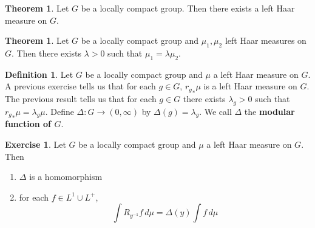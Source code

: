 \documentclass[12pt]{amsart}
\theoremstyle{definition}
\newtheorem{defn}[definition]{Definition}
\newtheorem{thm}[definition]{Theorem}
\newtheorem{ex}[definition]{Exercise}
\newcommand{\Del}{\Delta}
\newcommand{\lam}{\lambda}
\newcommand{\dmu}{\, d \mu}
\newcommand{\lex}[1]{\label{ex:#1}}
\newcommand{\ld}[1]{\label{defn:#1}}
\begin{document}
	\begin{thm}
		Let $G$ be a locally compact group. Then there exists a left Haar measure on $G$. 
	\end{thm}
	
	\begin{thm}
		Let $G$ be a locally compact group and $\mu_1, \mu_2$ left Haar measures on $G$. Then there exists $\lam > 0$ such that $\mu_1 = \lam \mu_2 $.
	\end{thm}
	
	\begin{defn} \ld{00000} 
		Let $G$ be a locally compact group and $\mu$ a left Haar measure on $G$. A previous exercise tells us that for each $g \in G$, ${r_g}_*\mu$ is a left Haar measure on $G$. The previous result tells us that for each $g \in G$ there exists $\lam_g >0$ such that ${r_g}_*\mu = \lam_g \mu$. Define $\Del: G \rightarrow (0, \infty)$ by $\Del(g) = \lam_g$. We call $\Del$ the \textbf{modular function of $G$}. 
	\end{defn}

	\begin{ex} \lex{00000} 
		Let $G$ be a locally compact group and $\mu$ a left Haar measure on $G$. Then 
		\begin{enumerate}
			\item $\Del $ is a homomorphism 
			\item for each $f \in L^1 \cup L^+$, $$\int R_{y^{-1}} f \dmu = \Del(y) \int f \dmu$$
		\end{enumerate}
	\end{ex}
\end{document}
